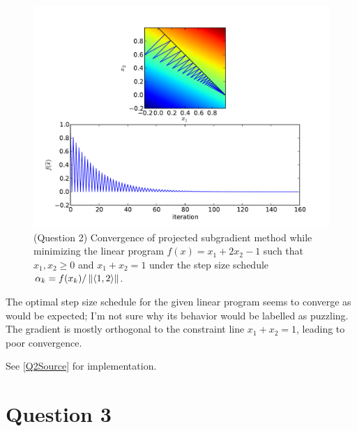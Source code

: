 \documentclass{article}
\begin{document}
\begin{figure}
  \center
  \includegraphics[scale=0.5]{q2-convergence.pdf}
  \caption{(Question 2) Convergence of projected subgradient method
while minimizing the linear program $f(x) = x_1 + 2x_2 - 1$ such that
$x_1, x_2 \ge 0$ and $x_1 + x_2 = 1$ under the step size schedule
$\alpha_k = f(x_k) / \left\lVert \langle 1,2\rangle \right\rVert$.}
  \label{Fig:Q2Convergence}
\end{figure}

The optimal step size schedule for the given linear
program seems to converge as would be expected; I'm not sure why its
behavior would be labelled as puzzling. The gradient is mostly
orthogonal to the constraint line $x_1 + x_2 = 1$, leading to poor
convergence.

See \ref{Q2Source} for implementation.

\section{Question 3}
\end{document}
